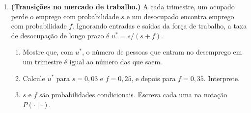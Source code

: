 \documentclass[11pt]{article}
\begin{document}
\begin{enumerate}[label=\textbf{A\arabic*.}, leftmargin=*]
\item \textbf{(Transições no mercado de trabalho.)} A cada trimestre, um ocupado perde o emprego com probabilidade $s$ e um desocupado
encontra emprego com probabilidade $f$. Ignorando entradas e saídas da força de trabalho, a taxa de desocupação de longo prazo é
$u^* = s/(s + f)$.
\begin{enumerate}[label=(\alph*)]
  \item Mostre que, com $u^*$, o número de pessoas que entram no desemprego em um trimestre é igual ao número das que saem.
  \item Calcule $u^*$ para $s = 0{,}03$ e $f = 0{,}25$, e depois para $f = 0{,}35$. Interprete.
  \item $s$ e $f$ são probabilidades condicionais. Escreva cada uma na notação $P(\cdot \mid \cdot)$.
\end{enumerate}

\end{enumerate}
\end{document}
